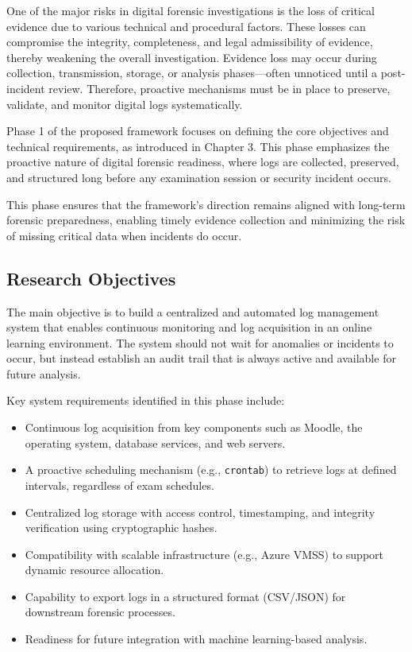 One of the major risks in digital forensic investigations is the loss of critical evidence due to various technical and procedural factors. These losses can compromise the integrity, completeness, and legal admissibility of evidence, thereby weakening the overall investigation. Evidence loss may occur during collection, transmission, storage, or analysis phases—often unnoticed until a post-incident review. Therefore, proactive mechanisms must be in place to preserve, validate, and monitor digital logs systematically.

Phase 1 of the proposed framework focuses on defining the core objectives and technical requirements, as introduced in Chapter 3. This phase emphasizes the proactive nature of digital forensic readiness, where logs are collected, preserved, and structured long before any examination session or security incident occurs.



This phase ensures that the framework's direction remains aligned with long-term forensic preparedness, enabling timely evidence collection and minimizing the risk of missing critical data when incidents do occur.
\subsection{Research Objectives}
The main objective is to build a centralized and automated log management system that enables continuous monitoring and log acquisition in an online learning environment. The system should not wait for anomalies or incidents to occur, but instead establish an audit trail that is always active and available for future analysis.

Key system requirements identified in this phase include:

\begin{itemize}
	\item Continuous log acquisition from key components such as Moodle, the operating system, database services, and web servers.
	\item A proactive scheduling mechanism (e.g., \texttt{crontab}) to retrieve logs at defined intervals, regardless of exam schedules.
	\item Centralized log storage with access control, timestamping, and integrity verification using cryptographic hashes.
	\item Compatibility with scalable infrastructure (e.g., Azure VMSS) to support dynamic resource allocation.
	\item Capability to export logs in a structured format (CSV/JSON) for downstream forensic processes.
	\item Readiness for future integration with machine learning-based analysis.
\end{itemize}


